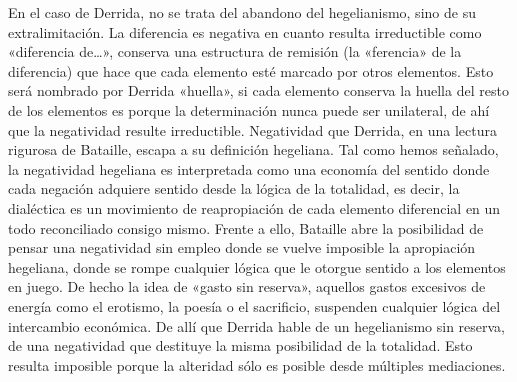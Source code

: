 En el caso de Derrida, no se trata del abandono del hegelianismo, sino de su extralimitación. La diferencia es negativa en cuanto resulta irreductible como «diferencia de\ldots», conserva una estructura de remisión (la «ferencia» de la diferencia) que hace que cada elemento esté marcado por otros elementos. Esto será nombrado por Derrida «huella», si cada elemento conserva la huella del resto de los elementos es porque la determinación nunca puede ser unilateral, de ahí que la negatividad resulte irreductible. Negatividad que Derrida, en una lectura rigurosa de Bataille, escapa a su definición hegeliana. Tal como hemos señalado, la negatividad hegeliana es interpretada como una economía del sentido donde cada negación adquiere sentido desde la lógica de la totalidad, es decir, la dialéctica es un movimiento de reapropiación de cada elemento diferencial en un todo reconciliado consigo mismo. Frente a ello, Bataille abre la posibilidad de pensar una negatividad sin empleo donde se vuelve imposible la apropiación hegeliana, donde se rompe cualquier lógica que le otorgue sentido a los elementos en juego. De hecho la idea de «gasto sin reserva», aquellos gastos excesivos de energía como el erotismo, la poesía o el sacrificio, suspenden cualquier lógica del intercambio económica. De allí que Derrida hable de un hegelianismo sin reserva, de una negatividad que destituye la misma posibilidad de la totalidad. Esto resulta imposible porque la alteridad sólo es posible desde múltiples mediaciones.

